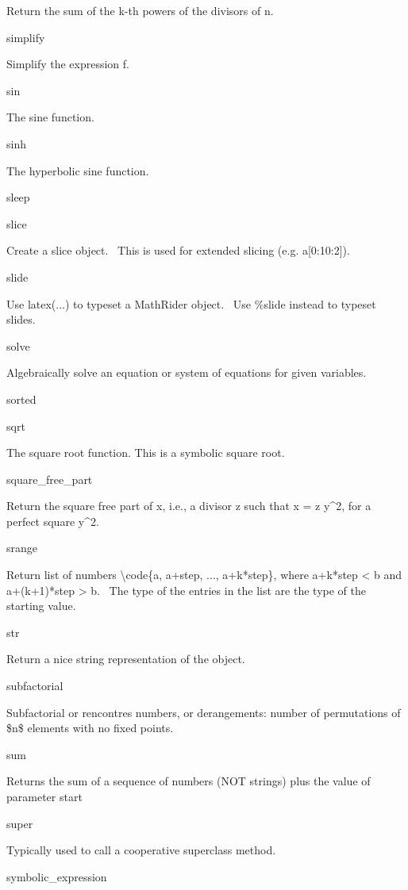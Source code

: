 \documentclass[12pt,twoside]{book}
\begin{document}
Return the sum of the k{}-th powers of the divisors of n.

simplify

Simplify the expression f.

sin

The sine function.

sinh

The hyperbolic sine function.

sleep


\bigskip

slice

Create a slice object. \ This is used for extended slicing (e.g. a[0:10:2]).

slide

Use latex(...) to typeset a MathRider object. \ Use \%slide instead to typeset slides.

solve

Algebraically solve an equation or system of equations for given variables.

sorted


\bigskip

sqrt

The square root function. This is a symbolic square root.

square\_free\_part

Return the square free part of x, i.e., a divisor z such that x = z y\^{}2, for a perfect square y\^{}2.

srange

Return list of numbers {\textbackslash}code\{a, a+step, ..., a+k*step\}, where a+k*step {\textless} b and a+(k+1)*step {\textgreater} b. \ The type of the entries in the list are the type of the starting value.

str

Return a nice string representation of the object.

subfactorial

Subfactorial or rencontres numbers, or derangements: number of permutations of \$n\$ elements with no fixed points.

sum

Returns the sum of a sequence of numbers (NOT strings) plus the value of parameter {\textquotesingle}start{\textquotesingle}

super

Typically used to call a cooperative superclass method.

symbolic\_expression 


\bigskip
\end{document}
